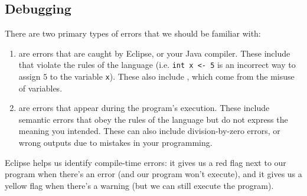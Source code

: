 \subsection{Debugging}

There are two primary types of errors that we should be familiar with:

\begin{enumerate}
    \item {} are errors that are caught by Eclipse, or your Java compiler. These include  that violate the rules of the language (i.e. \verb!int x <- 5! is an incorrect way to assign $5$ to the variable \verb!x!). These also include , which come from the misuse of variables.
    \item {} are errors that appear during the program's execution. These include semantic errors that obey the rules of the language but do not express the meaning you intended. These can also include division-by-zero errors, or wrong outputs due to mistakes in your programming.
\end{enumerate}

Eclipse helps us identify compile-time errors: it gives us a red flag next to our program when there's an error (and our program won't execute), and it gives us a yellow flag when there's a warning (but we can still execute the program).